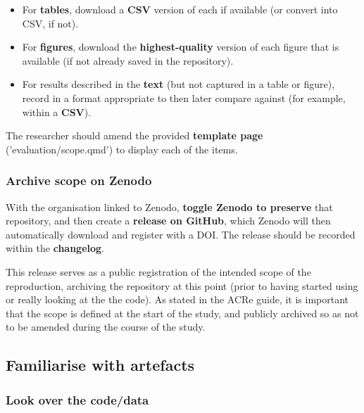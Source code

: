\begin{itemize}
    \item For \textbf{tables}, download a \textbf{CSV} version of each if available (or convert into CSV, if not).
    \item For \textbf{figures}, download the \textbf{highest-quality} version of each figure that is available (if not already saved in the repository).
    \item For results described in the \textbf{text} (but not captured in a table or figure), record in a format appropriate to then later compare against (for example, within a \textbf{CSV}).
\end{itemize}

The researcher should amend the provided \textbf{template page} ('evaluation/scope.qmd') to display each of the items.

\vspace{0.5cm}
\subsubsection{Archive scope on Zenodo}

With the organisation linked to Zenodo, \textbf{toggle Zenodo to preserve} that repository, and then create a \textbf{release on GitHub}, which Zenodo will then automatically download and register with a DOI. The release should be recorded within the \textbf{changelog}.

This release serves as a public registration of the intended scope of the reproduction, archiving the repository at this point (prior to having started using or really looking at the the code). As stated in the ACRe guide,\autocite{berkeley_initiative_for_transparency_in_the_social_sciences_guide_2022} it is important that the scope is defined at the start of the study, and publicly archived so as not to be amended during the course of the study.\autocite{berkeley_initiative_for_transparency_in_the_social_sciences_guide_2022}

\vspace{0.5cm}
\subsection{Familiarise with artefacts}

\subsubsection{Look over the code/data}

